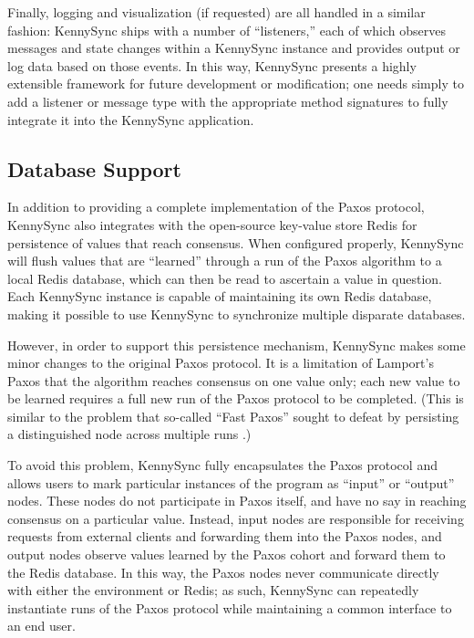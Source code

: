 \documentclass{acm_proc_article-sp}
\begin{document}
Finally, logging and visualization (if requested) are all handled in a similar
fashion: KennySync ships with a number of ``listeners,'' each of which observes
messages and state changes within a KennySync instance and provides output or
log data based on those events. In this way, KennySync presents a highly
extensible framework for future development or modification; one needs simply to
add a listener or message type with the appropriate method signatures to fully
integrate it into the KennySync application.

\subsection{Database Support}

In addition to providing a complete implementation of the Paxos protocol,
KennySync also integrates with the open-source key-value store Redis for
persistence of values that reach consensus. When configured properly, KennySync
will flush values that are ``learned'' through a run of the Paxos algorithm to
a local Redis database, which can then be read to ascertain a value in question.
Each KennySync instance is capable of maintaining its own Redis database, making
it possible to use KennySync to synchronize multiple disparate databases.

However, in order to support this persistence mechanism, KennySync makes some
minor changes to the original Paxos protocol. It is a limitation of Lamport's
Paxos that the algorithm reaches consensus on one value only; each new value to
be learned requires a full new run of the Paxos protocol to be completed. (This
is similar to the problem that so-called ``Fast Paxos'' sought to defeat by
persisting a distinguished node across multiple runs \cite{fast-paxos}.)

To avoid this problem, KennySync fully encapsulates the Paxos protocol and
allows users to mark particular instances of the program as ``input'' or
``output'' nodes. These nodes do not participate in Paxos itself, and have no
say in reaching consensus on a particular value. Instead, input nodes are
responsible for receiving requests from external clients and forwarding them
into the Paxos nodes, and output nodes observe values learned by the Paxos
cohort and forward them to the Redis database. In this way, the Paxos nodes
never communicate directly with either the environment or Redis; as such,
KennySync can repeatedly instantiate runs of the Paxos protocol while
maintaining a common interface to an end user.
\end{document}
